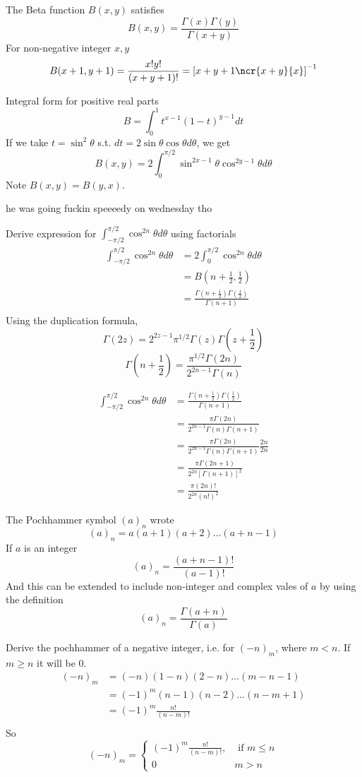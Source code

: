 \documentclass{X:/Documents/Coding/Latex/myassignment}
\begin{document}
The Beta function $B(x,y)$ satisfies
\[B(x,y) = \frac{\Gamma(x)\Gamma(y)}{\Gamma(x+y)}\]
For non-negative integer $x,y$
\[B(x+1,y+1) = \frac{x!y!}{(x+y+1)!} = \left[x+y+1 \ncr{x+y}{x}\right]^{-1}\]

Integral form for positive real parts
\[B = \int_0^1 t^{x-1} (1-t)^{y-1} dt\]
If we take $t = \sin^2\theta$ s.t. $dt = 2\sin\theta\cos\theta d\theta$, we get
\[B(x,y) = 2\int_0^{\pi/2} \sin^{2x-1}\theta \cos^{2y-1} \theta d \theta\]
Note $B(x,y) = B(y,x)$.

he was going fuckin speeeedy on wednesday tho 

Derive expression for $\int_{-\pi/2}^{\pi/2} \cos^{2n}\theta d\theta$ using factorials
\begin{align*}
	\int_{-\pi/2}^{\pi/2} \cos^{2n}\theta d\theta &=2\int_0^{\pi/2} \cos^{2n}\theta d\theta\\
	&= B(n+\frac12, \frac12)\\
	&=\frac{\Gamma(n+\frac12)\Gamma(\frac12)}{\Gamma(n+1)}\\
\end{align*}
Using the duplication formula,
\[\Gamma(2z) = 2^{2z-1} \pi^{1/2} \Gamma(z) \Gamma(z+\frac12)\]
\[\Gamma(n+\frac12) = \frac{\pi^{1/2} \Gamma(2n)}{2^{2n-1} \Gamma(n)}\]

\begin{align*}
	\int_{-\pi/2}^{\pi/2} \cos^{2n}\theta d\theta &=\frac{\Gamma(n+\frac12)\Gamma(\frac12)}{\Gamma(n+1)}\\
	&= \frac{\pi \Gamma(2n)}{2^{2n-1}\Gamma(n) \Gamma(n+1)}\\
	&= \frac{\pi \Gamma(2n)}{2^{2n-1}\Gamma(n) \Gamma(n+1)} \frac{2n}{2n}\\
	&= \frac{\pi \Gamma(2n+1)}{2^{2n} [\Gamma(n+1)]^2} \\
	&= \frac{\pi (2n)!}{2^{2n}(n!)^2}
\end{align*}

The Pochhammer symbol $(a)_n$ wrote
\[(a)_n = a(a+1)(a+2)\ldots(a+n-1)\]
If $a$ is an integer
\[(a)_n = \frac{(a+n-1)!}{(a-1)!}\]
And this can be extended to include non-integer and complex vales of $a$ by using the definition
\[(a)_n = \frac{\Gamma(a+n)}{\Gamma(a)}\]

Derive the pochhammer of a negative integer, i.e. for $(-n)_m$, where $m < n$.
If $m \geq n$ it will be $0$.
\begin{align*}
	(-n)_m &= (-n)(1-n)(2-n)\ldots(m-n-1)\\
		&=(-1)^m (n-1)(n-2)\ldots(n-m+1)\\
		&=(-1)^m \frac{n!}{(n-m)!}\\
\end{align*}
So
\[(-n)_m = \begin{cases}
	(-1)^m \frac{n!}{(n-m)!}, &\text{ if }m\leq n\\
	0&m > n
\end{cases} \]
\end{document}
